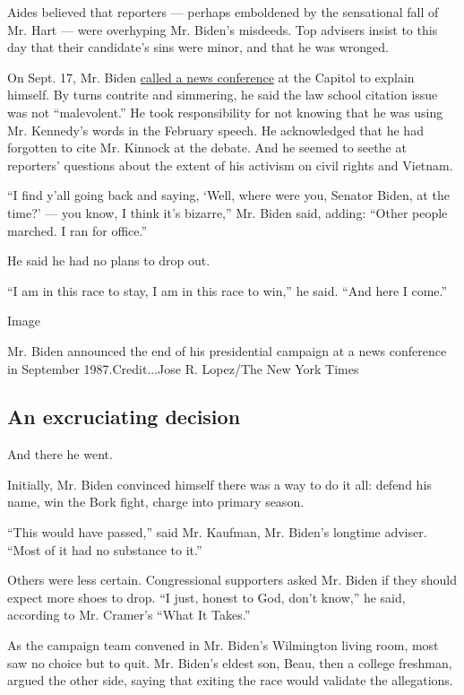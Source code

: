 Aides believed that reporters --- perhaps emboldened by the sensational
fall of Mr. Hart --- were overhyping Mr. Biden's misdeeds. Top advisers
insist to this day that their candidate's sins were minor, and that he
was wronged.

On Sept. 17, Mr. Biden
\href{https://www.nytimes3xbfgragh.onion/1987/09/18/us/biden-admits-plagiarism-in-school-but-says-it-was-not-malevolent.html}{called
a news conference} at the Capitol to explain himself. By turns contrite
and simmering, he said the law school citation issue was not
``malevolent.'' He took responsibility for not knowing that he was using
Mr. Kennedy's words in the February speech. He acknowledged that he had
forgotten to cite Mr. Kinnock at the debate. And he seemed to seethe at
reporters' questions about the extent of his activism on civil rights
and Vietnam.

``I find y'all going back and saying, `Well, where were you, Senator
Biden, at the time?' --- you know, I think it's bizarre,'' Mr. Biden
said, adding: ``Other people marched. I ran for office.''

He said he had no plans to drop out.

``I am in this race to stay, I am in this race to win,'' he said. ``And
here I come.''

Image

Mr. Biden announced the end of his presidential campaign at a news
conference in September 1987.Credit...Jose R. Lopez/The New York Times

\hypertarget{an-excruciating-decision}{%
\subsection{An excruciating decision}\label{an-excruciating-decision}}

And there he went.

Initially, Mr. Biden convinced himself there was a way to do it all:
defend his name, win the Bork fight, charge into primary season.

``This would have passed,'' said Mr. Kaufman, Mr. Biden's longtime
adviser. ``Most of it had no substance to it.''

Others were less certain. Congressional supporters asked Mr. Biden if
they should expect more shoes to drop. ``I just, honest to God, don't
know,'' he said, according to Mr. Cramer's ``What It Takes.''

As the campaign team convened in Mr. Biden's Wilmington living room,
most saw no choice but to quit. Mr. Biden's eldest son, Beau, then a
college freshman, argued the other side, saying that exiting the race
would validate the allegations.

